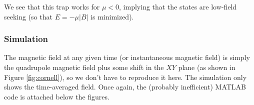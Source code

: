 \documentclass{book}
\theoremstyle{definition}
\begin{document}
We see that this trap works for $\mu < 0$, implying that the states are low-field seeking (so that $E = -\mu |B|$ is minimized). 

\subsubsection*{Simulation}


The magnetic field at any given time (or instantaneous magnetic field) is simply the quadrupole magnetic field plus some shift in the $XY$ plane (as shown in Figure \ref{fig:cornell}), so we don't have to reproduce it here. The simulation only shows the time-averaged field. Once again, the (probably inefficient) MATLAB code is attached below the figures.




\begin{figure}[!htb]
	\centering
	\begin{minipage}{.49\textwidth}
		\centering

\end{minipage}
\end{figure}
\end{document}
